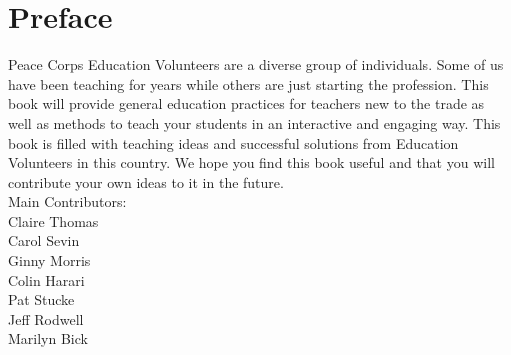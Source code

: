 \chapter*{Preface}
Peace Corps Education Volunteers are a diverse group of individuals. Some of us have been teaching for years while others are just starting the profession. This book will provide general education practices for teachers new to the trade as well as methods to teach your students in an interactive and engaging way. This book is filled with teaching ideas and successful solutions from Education Volunteers in this country. We hope you find this book useful and that you will contribute your own ideas to it in the future.\\[1in]
Main Contributors:\\
Claire Thomas\\
Carol Sevin\\
Ginny Morris\\
Colin Harari\\ 
Pat Stucke\\
Jeff Rodwell\\
Marilyn Bick\\
